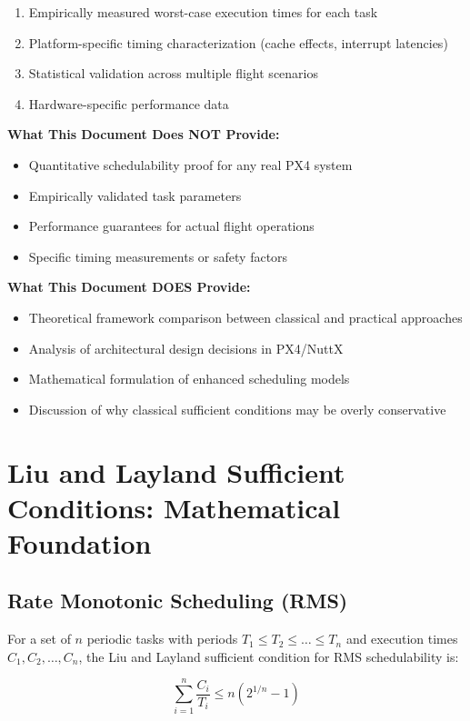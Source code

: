 \documentclass[12pt,a4paper]{article}
\begin{document}
\begin{enumerate}
\item Empirically measured worst-case execution times for each task
\item Platform-specific timing characterization (cache effects, interrupt latencies)
\item Statistical validation across multiple flight scenarios
\item Hardware-specific performance data
\end{enumerate}

\textbf{What This Document Does NOT Provide:}
\begin{itemize}
\item Quantitative schedulability proof for any real PX4 system
\item Empirically validated task parameters
\item Performance guarantees for actual flight operations
\item Specific timing measurements or safety factors
\end{itemize}

\textbf{What This Document DOES Provide:}
\begin{itemize}
\item Theoretical framework comparison between classical and practical approaches
\item Analysis of architectural design decisions in PX4/NuttX
\item Mathematical formulation of enhanced scheduling models
\item Discussion of why classical sufficient conditions may be overly conservative
\end{itemize}

\section{Liu and Layland Sufficient Conditions: Mathematical Foundation}

\subsection{Rate Monotonic Scheduling (RMS)}

For a set of $n$ periodic tasks with periods $T_1 \leq T_2 \leq \ldots \leq T_n$ and execution times $C_1, C_2, \ldots, C_n$, the Liu and Layland sufficient condition for RMS schedulability is:

\begin{equation}
\sum_{i=1}^{n} \frac{C_i}{T_i} \leq n(2^{1/n} - 1)
\end{equation}
\end{document}
